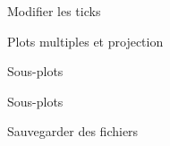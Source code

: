 \begin{frame}{Modifier les ticks}
    \begin{minipage}[c]{0.49\linewidth}
    \end{minipage}
    \begin{minipage}[c]{0.49\linewidth}
    \end{minipage}
\end{frame}

\begin{frame}{Plots multiples et projection}
\end{frame}

\begin{frame}{Sous-plots}
\end{frame}

\begin{frame}{Sous-plots}
\end{frame}

\begin{frame}{Sauvegarder des fichiers}
\end{frame}